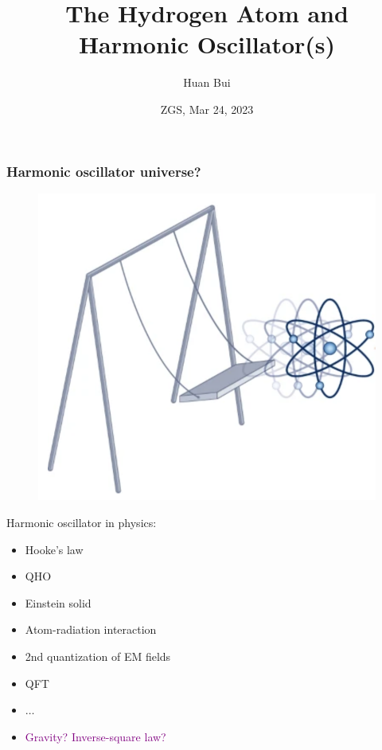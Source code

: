 \documentclass{beamer}
\title[\textcolor{white}{{}}]
{
The Hydrogen Atom and Harmonic Oscillator(s)
}
\author[Bui] %
{Huan Bui}
\institute[MIT]{MIT} %
\date{ZGS, Mar 24, 2023}
\theoremstyle{definition}
\begin{document}
 
\frame{\titlepage}

\begin{frame}
	\frametitle{Harmonic oscillator universe?}
	
	\begin{minipage}{0.39\textwidth}
	\begin{figure}
	\centering
	\includegraphics[width=1\textwidth]{figures/swinging_atom.png}
	\end{figure}
	\end{minipage}
	\begin{minipage}{0.6\textwidth}
	Harmonic oscillator in physics: \pause
	\begin{itemize}
		\item Hooke's law \pause
		\item QHO \pause
		\item Einstein solid \pause
		\item Atom-radiation interaction \pause
		\item 2nd quantization of EM fields  \pause
		\item QFT \pause
		\item $\dots$ \pause
		\item \textcolor{purple}{Gravity? Inverse-square law?}	
	\end{itemize}
	\end{minipage}
	
	
	
\end{frame}
\end{document}

